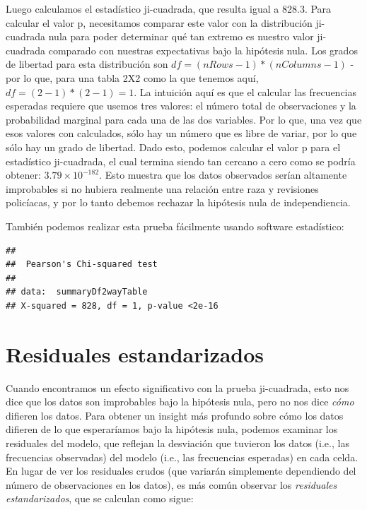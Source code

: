 \documentclass[
  12pt,
]{book}
\theoremstyle{definition}
\theoremstyle{definition}
\theoremstyle{definition}
\theoremstyle{remark}
\begin{document}
Luego calculamos el estadístico ji-cuadrada, que resulta igual a 828.3.
Para calcular el valor p, necesitamos comparar este valor con la distribución ji-cuadrada nula para poder determinar qué tan extremo es nuestro valor ji-cuadrada comparado con nuestras expectativas bajo la hipótesis nula. Los grados de libertad para esta distribución son \(df = (nRows - 1) * (nColumns - 1)\) - por lo que, para una tabla 2X2 como la que tenemos aquí, \(df = (2-1)*(2-1)=1\). La intuición aquí es que el calcular las frecuencias esperadas requiere que usemos tres valores: el número total de observaciones y la probabilidad marginal para cada una de las dos variables. Por lo que, una vez que esos valores con calculados, sólo hay un número que es libre de variar, por lo que sólo hay un grado de libertad. Dado esto, podemos calcular el valor p para el estadístico ji-cuadrada, el cual termina siendo tan cercano a cero como se podría obtener: \(3.79 \times 10^{-182}\). Esto muestra que los datos observados serían altamente improbables si no hubiera realmente una relación entre raza y revisiones policíacas, y por lo tanto debemos rechazar la hipótesis nula de independiencia.

También podemos realizar esta prueba fácilmente usando software estadístico:

\begin{verbatim}
## 
## 	Pearson's Chi-squared test
## 
## data:  summaryDf2wayTable
## X-squared = 828, df = 1, p-value <2e-16
\end{verbatim}

\hypertarget{residuales-estandarizados}{%
\section{Residuales estandarizados}\label{residuales-estandarizados}}

Cuando encontramos un efecto significativo con la prueba ji-cuadrada, esto nos dice que los datos son improbables bajo la hipótesis nula, pero no nos dice \emph{cómo} difieren los datos. Para obtener un insight más profundo sobre cómo los datos difieren de lo que esperaríamos bajo la hipótesis nula, podemos examinar los residuales del modelo, que reflejan la desviación que tuvieron los datos (i.e., las frecuencias observadas) del modelo (i.e., las frecuencias esperadas) en cada celda. En lugar de ver los residuales crudos (que variarán simplemente dependiendo del número de observaciones en los datos), es más común observar los \emph{residuales estandarizados}, que se calculan como sigue:
\end{document}
